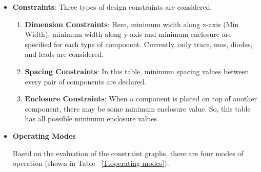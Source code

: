 \documentclass[11pt]{article}
\begin{document}
\begin{itemize}
\item \textbf{Constraints}:
Three types of design constraints are considered.
\begin{enumerate}
    \item \textbf{Dimension Constraints}: Here, minimum width along x-axis (Min Width), minimum width along y-axis and minimum enclosure are specified for each type of component. Currently, only trace, mos, diodes, and leads are considered. 
    \item \textbf{Spacing Constraints}: In this table, minimum spacing values between every pair of components are declared. 
    \item \textbf{Enclosure Constraints}: When a component is placed on top of another component, there may be some minimum enclosure value. So, this table has all possible minimum enclosure values.
\end{enumerate}
\item \textbf{Operating Modes}

Based on the evaluation of the constraint graphs, there are four modes of operation (shown in Table ~\ref{T.operating modes}).


\end{itemize}
\end{document}

